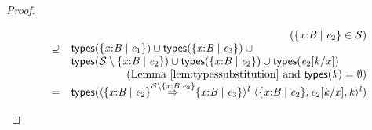 \documentclass[9pt]{extarticle}
\newcommand{\ottnt}[1]{\mathit{#1}}
\begin{document}
\begin{lemma}
\begin{proof}
{\begin{itemize}
\[\begin{array}{rcl}
        \multicolumn{3}{r}{\text{($  \{ \mathit{x} \mathord{:} \ottnt{B} \mathrel{\mid} \ottnt{e_{{\mathrm{2}}}} \}   \in  \mathcal{S} $)}} \\
        &\supseteq&      \mathsf{types} (  \{ \mathit{x} \mathord{:} \ottnt{B} \mathrel{\mid} \ottnt{e_{{\mathrm{1}}}} \}  )   \cup   \mathsf{types} (  \{ \mathit{x} \mathord{:} \ottnt{B} \mathrel{\mid} \ottnt{e_{{\mathrm{3}}}} \}  )    \cup  {} \\  &  &   \mathsf{types} (  \mathcal{S}  \setminus   \{ \mathit{x} \mathord{:} \ottnt{B} \mathrel{\mid} \ottnt{e_{{\mathrm{2}}}} \}   )    \cup   \mathsf{types} (  \{ \mathit{x} \mathord{:} \ottnt{B} \mathrel{\mid} \ottnt{e_{{\mathrm{2}}}} \}  )    \cup   \mathsf{types} (  \ottnt{e_{{\mathrm{2}}}}  [  \ottnt{k} / \mathit{x}  ]  )   \\
        \multicolumn{3}{r}{\text{(Lemma~\ref{lem:typessubstitution} and $ \mathsf{types} ( \ottnt{k} )  =  \emptyset $)}}\\
        &=&  \mathsf{types} (  \langle   \{ \mathit{x} \mathord{:} \ottnt{B} \mathrel{\mid} \ottnt{e_{{\mathrm{2}}}} \}   \mathord{ \overset{  \mathcal{S}  \setminus   \{ \mathit{x} \mathord{:} \ottnt{B} \mathrel{\mid} \ottnt{e_{{\mathrm{2}}}} \}   }{\Rightarrow} }   \{ \mathit{x} \mathord{:} \ottnt{B} \mathrel{\mid} \ottnt{e_{{\mathrm{3}}}} \}   \rangle^{ \ottnt{l} } ~   \langle   \{ \mathit{x} \mathord{:} \ottnt{B} \mathrel{\mid} \ottnt{e_{{\mathrm{2}}}} \}  ,   \ottnt{e_{{\mathrm{2}}}}  [  \ottnt{k} / \mathit{x}  ]  ,  \ottnt{k}  \rangle^{ \ottnt{l} }   ) 
      \end{array} \]
    \end{itemize}

}
\end{proof}
\end{lemma}
\end{document}
